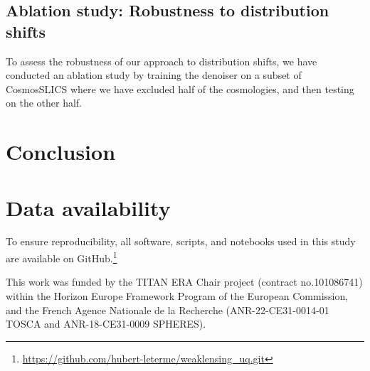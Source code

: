 \documentclass{aa}
\begin{document}
\subsection{Ablation study: Robustness to distribution shifts}

To assess the robustness of our approach to distribution shifts, we have conducted an ablation study by training the denoiser on a subset of CosmosSLICS where we have excluded half of the cosmologies, and then testing on the other half.  

\section{Conclusion}
\label{sec:concl}

\section*{Data availability}

To ensure reproducibility, all software, scripts, and notebooks used in this study are available on GitHub.\footnote{\url{https://github.com/hubert-leterme/weaklensing_uq.git}} \todo[to be updated]


\begin{acknowledgements}
    This work was funded by the TITAN ERA Chair project (contract no.\@ 101086741) within the Horizon Europe Framework Program of the European Commission, and the French Agence Nationale de la Recherche (ANR-22-CE31-0014-01 TOSCA and ANR-18-CE31-0009 SPHERES).
\end{acknowledgements}

%
%


\end{document}
